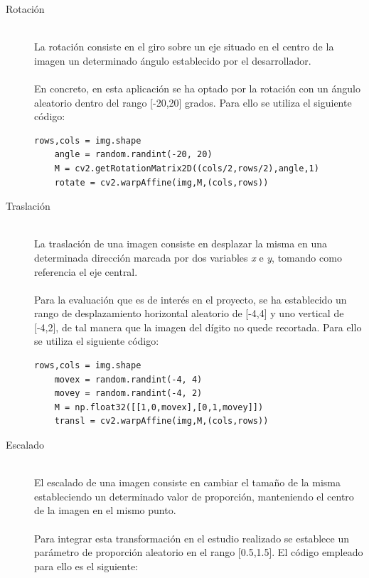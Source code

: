 \begin{description}
	\item[Rotación] \hfill 
	\vspace{10pt}
	\\
	La rotación consiste en el giro sobre un eje situado en el centro de la imagen un determinado ángulo establecido por el desarrollador.\\
	\vspace{-10pt}
	\\
	En concreto, en esta aplicación se ha optado por la rotación con un ángulo aleatorio dentro del rango [-20,20] grados. Para ello se utiliza el siguiente código:
	\vspace{10pt}
	\begin{lstlisting}[frame=single]
	rows,cols = img.shape
	angle = random.randint(-20, 20)
	M = cv2.getRotationMatrix2D((cols/2,rows/2),angle,1)
	rotate = cv2.warpAffine(img,M,(cols,rows))
	\end{lstlisting}
	\item[Traslación] \hfill 
	\vspace{10pt}
	\\
	La traslación de una imagen consiste en desplazar la misma en una determinada dirección marcada por dos variables \textit{x} e \textit{y}, tomando como referencia el eje central.\\
	\vspace{-10pt}
	\\
	Para la evaluación que es de interés en el proyecto, se ha establecido un rango de desplazamiento horizontal aleatorio de [-4,4] y uno vertical de [-4,2], de tal manera que la imagen del dígito no quede recortada. Para ello se utiliza el siguiente código:
	\vspace{10pt}
	\begin{lstlisting}[frame=single]
	rows,cols = img.shape
	movex = random.randint(-4, 4)
	movey = random.randint(-4, 2)
	M = np.float32([[1,0,movex],[0,1,movey]])
	transl = cv2.warpAffine(img,M,(cols,rows))
	\end{lstlisting}
	\item[Escalado] \hfill 
	\vspace{10pt}
	\\
	El escalado de una imagen consiste en cambiar el tamaño de la misma estableciendo un determinado valor de proporción, manteniendo el centro de la imagen en el mismo punto.\\
	\vspace{-10pt}
	\\
	Para integrar esta transformación en el estudio realizado se establece un parámetro de proporción aleatorio en el rango [0.5,1.5]. El código empleado para ello es el siguiente:

\end{description}
